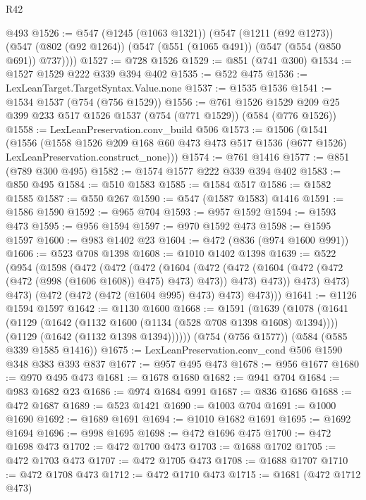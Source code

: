 \begin{lexlean}{R42}
\begin{coremodule}
    @493
@1526 := @547
    (@1245 (@1063 @1321))
    (@547
      (@1211 (@92 @1273))
      (@547 (@802 (@92 @1264)) (@547 (@551 (@1065 @491)) (@547 (@554 (@850 @691)) @737))))
@1527 := @728 @1526
@1529 := @851 (@741 @300)
@1534 := @1527 @1529 @222 @339 @394 @402
@1535 := @522 @475
@1536 := LexLeanTarget.TargetSyntax.Value.none
@1537 := @1535 @1536
@1541 := @1534 @1537 (@754 (@756 @1529))
@1556 := @761
    @1526
    @1529
    @209
    @25
    @399
    @233
    @517
    @1526
    @1537
    (@754 (@771 @1529))
    (@584 (@776 @1526))
@1558 := LexLeanPreservation.conv_build @506
@1573 := @1506
    (@1541
      (@1556
        (@1558
          @1526
          @209
          @168
          @60
          @473
          @473
          @517
          @1536
          (@677 @1526)
          LexLeanPreservation.construct_none)))
@1574 := @761 @1416
@1577 := @851 (@789 @300 @495)
@1582 := @1574 @1577 @222 @339 @394 @402
@1583 := @850 @495
@1584 := @510 @1583
@1585 := @1584 @517
@1586 := @1582 @1585
@1587 := @550 @267
@1590 := @547 (@1587 @1583) @1416
@1591 := @1586 @1590
@1592 := @965 @704
@1593 := @957 @1592
@1594 := @1593 @473
@1595 := @956 @1594
@1597 := @970 @1592 @473
@1598 := @1595 @1597
@1600 := @983 @1402 @23
@1604 := @472 (@836 (@974 @1600 @991))
@1606 := @523 @708 @1398
@1608 := @1010 @1402 @1398
@1639 := @522
    (@954
      (@1598
        (@472
          (@472
            (@472
              (@1604
                (@472
                  (@472 (@1604 (@472 (@472 (@472 (@998 (@1606 @1608)) @475) @473) @473)) @473)
                  @473))
              @473)
            @473)
          @473)
        (@472 (@472 (@472 (@1604 @995) @473) @473) @473)))
@1641 := @1126 @1594 @1597
@1642 := @1130 @1600
@1668 := @1591
    (@1639
      (@1078
        (@1641
          (@1129 (@1642 (@1132 @1600 (@1134 (@528 @708 @1398 @1608) @1394))))
          (@1129 (@1642 (@1132 @1398 @1394))))))
    (@754 (@756 @1577))
    (@584 (@585 @339 @1585 @1416))
@1675 := LexLeanPreservation.conv_cond @506 @1590 @348 @383 @393 @837
@1677 := @957 @495 @473
@1678 := @956 @1677
@1680 := @970 @495 @473
@1681 := @1678 @1680
@1682 := @941 @704
@1684 := @983 @1682 @23
@1686 := @974 @1684 @991
@1687 := @836 @1686
@1688 := @472 @1687
@1689 := @523 @1421
@1690 := @1003 @704
@1691 := @1000 @1690
@1692 := @1689 @1691
@1694 := @1010 @1682 @1691
@1695 := @1692 @1694
@1696 := @998 @1695
@1698 := @472 @1696 @475
@1700 := @472 @1698 @473
@1702 := @472 @1700 @473
@1703 := @1688 @1702
@1705 := @472 @1703 @473
@1707 := @472 @1705 @473
@1708 := @1688 @1707
@1710 := @472 @1708 @473
@1712 := @472 @1710 @473
@1715 := @1681 (@472 @1712 @473)

\end{coremodule}
\end{lexlean}

